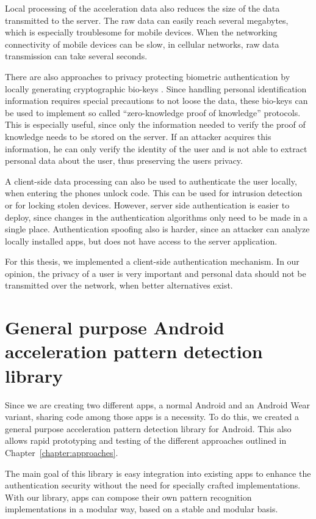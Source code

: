Local processing of the acceleration data also reduces the size of the data transmitted to the server. The raw data can easily reach several megabytes, which is especially troublesome for mobile devices. When the networking connectivity of mobile devices can be slow, \eg in cellular networks, raw data transmission can take several seconds.

There are also approaches to privacy protecting biometric authentication by locally generating cryptographic bio-keys \cite{bhargav2006privacy, verbitskiy2003reliable, ross2011visual}. Since handling personal identification information requires special precautions to not loose the data, these bio-keys can be used to implement so called ``zero-knowledge proof of knowledge'' protocols. This is especially useful, since only the information needed to verify the proof of knowledge needs to be stored on the server. If an attacker acquires this information, he can only verify the identity of the user and is not able to extract personal data about the user, thus preserving the users privacy.

A client-side data processing can also be used to authenticate the user locally, \eg when entering the phones unlock code. This can be used for intrusion detection or for locking stolen devices. However, server side authentication is easier to deploy, since changes in the authentication algorithms only need to be made in a single place. Authentication spoofing also is harder, since an attacker can analyze locally installed apps, but does not have access to the server application.

For this thesis, we implemented a client-side authentication mechanism. In our opinion, the privacy of a user is very important and personal data should not be transmitted over the network, when better alternatives exist.

\section{General purpose Android acceleration pattern detection library}
Since we are creating two different apps, a normal Android and an Android Wear variant, sharing code among those apps is a necessity. To do this, we created a general purpose acceleration pattern detection library for Android. This also allows rapid prototyping and testing of the different approaches outlined in Chapter~\ref{chapter:approaches}.

The main goal of this library is easy integration into existing apps to enhance the authentication security without the need for specially crafted implementations. With our library, apps can compose their own pattern recognition implementations in a modular way, based on a stable and modular basis.

